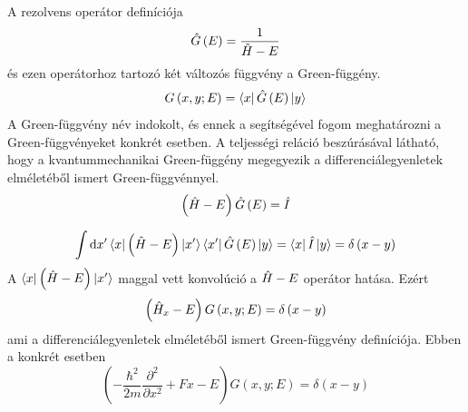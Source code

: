 A rezolvens operátor definíciója
\begin{equation}
    \hat{G}\left( E \right) = \frac{1}{\hat{H} - E}
\end{equation}
és ezen operátorhoz tartozó két változós függvény a Green-függény.
\begin{equation}
    G\left( x, y; E \right) = \Bra{x}\hat{G}\left(E\right)\Ket{y}
\end{equation}
A Green-függvény név indokolt, és ennek a segítségével fogom meghatározni a Green-függvényeket konkrét esetben. A teljességi reláció beszúrásával látható, hogy a kvantummechanikai Green-függény megegyezik a differenciálegyenletek elméletéből ismert Green-függvénnyel.
\begin{equation}
    \left(\hat{H} - E\right) \hat{G}\left( E \right) = \hat{I}
\end{equation}

\begin{equation}
    \int \mathrm{d}x^\prime \Bra{x}\left(\hat{H} - E\right) \Ket{x^\prime}\Bra{x^\prime} \hat{G}\left( E \right)\Ket{y} = \Bra{x}\hat{I}\Ket{y} = \delta \left(x - y\right)
\end{equation} 
A $\Bra{x}\left(\hat{H} - E\right) \Ket{x^\prime}$ maggal vett konvolúció a $\hat{H} - E$ operátor hatása. Ezért
\begin{equation}
    \left(\hat{H}_x - E\right) G\left(x, y; E\right) = \delta\left(x - y\right)
\end{equation}
ami a differenciálegyenletek elméletéből ismert Green-függvény definíciója. Ebben a konkrét esetben
\begin{equation}
    \left( -\frac{\hbar^2}{2m}\frac{\partial^2}{\partial x^2} + Fx - E \right) G\left(x, y; E\right) = \delta\left(x - y\right)
	\label{green:deltaeq}
\end{equation}
